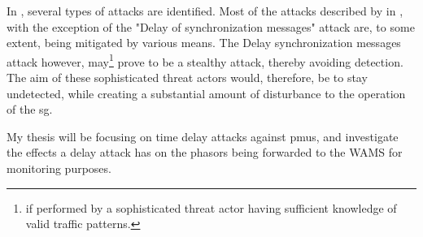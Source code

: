 

In \cite{ullmann2009delay}, several types of attacks are identified. Most of the attacks described by \citeauthor{ullmann2009delay}in \cite{ullmann2009delay}, with the exception of the "Delay of synchronization messages" attack are, to some extent, being mitigated by various means. The Delay  synchronization messages attack however, may\footnote{if performed by a sophisticated threat actor having sufficient knowledge of valid traffic patterns.} prove to be a stealthy attack, thereby avoiding detection.  The aim of these sophisticated threat actors would, therefore, be to stay undetected, while creating a substantial amount of disturbance to the operation of the \acrshort{sg}.






My thesis will be focusing on time delay attacks against \acrshort{pmu}s, and investigate the effects a delay attack has on the phasors being forwarded to the WAMS for monitoring purposes. 

